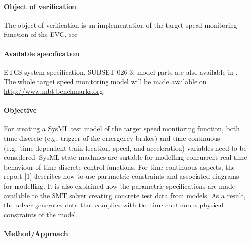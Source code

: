 \paragraph{Object of verification}

The object of verification is an implementation of the target speed monitoring function of the EVC,
see \cite{HHP14}

\paragraph{Available specification}
ETCS system specification, SUBSET-026-3; model parts are also
available in \cite{HHP14}. The whole target speed monitoring model
will be made available on \url{http://www.mbt-benchmarks.org}.

\paragraph{Objective}
For creating a SysML test model of the target speed monitoring function, both time-discrete
(e.g.~trigger of the emergency brakes) and time-continuous (e.g.~time-dependent 
train location, speed, and acceleration) variables 
need to be considered. SysML state machines
are suitable for modelling concurrent real-time behaviour of time-discrete control
functions. For time-continuous aspects, the report [1] describes how to use
parametric constraints and associated diagrams for modelling. It is also explained
how the parametric specifications are made available to the SMT solver creating 
concrete test data from models. As a result, the solver generates data that 
complies with the time-continuous physical constraints of the model. 


\paragraph{Method/Approach}

